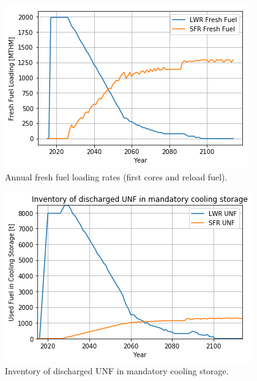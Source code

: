 \begin{figure}[htbp!]
	\begin{center}
		\includegraphics[scale=0.6]{./images/results/fuel_load.png}
	\end{center}
        \caption{Annual fresh fuel loading rates (first cores and reload fuel).}
	\label{fig:fuel_load}
\end{figure}



\begin{figure}[htbp!]
	\begin{center}
		\includegraphics[scale=0.6]{./images/results/fuel_discharge.png}
	\end{center}
        \caption{Inventory of discharged \gls{UNF} in mandatory cooling storage.}
	\label{fig:fuel_discharge}
\end{figure}



